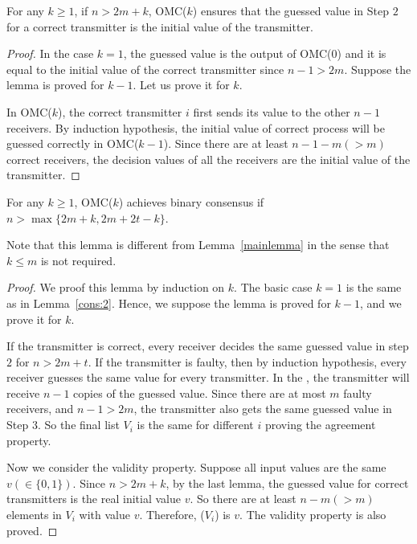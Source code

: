 \begin{lemma}
For any $k\geqslant 1$, if $n>2m+k$, OMC($k$) ensures that the guessed value in Step $2$ for a correct transmitter is the initial value of the transmitter.
\end{lemma}

\begin{proof}
In the case $k=1$, the guessed value is the output of OMC(0) and  it is equal to the initial value of the correct transmitter since $n-1>2m$. Suppose the lemma is proved for $k-1$. Let us prove it for $k$.

In OMC($k$), the correct transmitter $i$ first sends its value to the other $n-1$ receivers. 
By induction hypothesis, the initial value of correct process will be guessed  correctly in OMC($k-1$). 
Since there are at least $n-1-m(>m)$ correct receivers, the decision values of all the receivers are the initial value of the transmitter.
\end{proof}

\begin{lemma}\label{cons:corelemma}
  For any $k \geqslant 1$, OMC($k$) achieves binary consensus if $n>\max\{2m+k,2m+2t-k\}$.
\end{lemma}

Note that this lemma is different from Lemma~\ref{mainlemma} in the sense that $k\leqslant m$ is not required.

\begin{proof}
We proof this lemma by induction on $k$. The basic case $k=1$ is the same as in Lemma~\ref{cons:2}.
Hence, we suppose the lemma is proved for $k-1$, and we prove it for $k$.

If the transmitter is correct, every receiver decides the same guessed value in step $2$ for $n>2m+t$. 
If the transmitter is faulty, then
by induction hypothesis, every receiver  guesses the same value for every transmitter. 
In the , the transmitter will receive $n-1$ copies of the guessed value. 
Since there are at most $m$ faulty receivers, and $n-1>2m$, the transmitter 
also gets the same guessed value in Step $3$. 
So the final list $V_i$ is the same for different $i$ proving the agreement property. 

Now we consider  the validity property.
Suppose all input values are the same $v(\in \{0,1\})$. 
Since $n>2m+k$, by the last lemma, the guessed value for correct transmitters is the real initial value $v$. So there are at least $n-m (> m)$ elements in $V_i$ with value $v$. Therefore, ($V_i$) is $v$. 
The validity property is also proved.
\end{proof}

